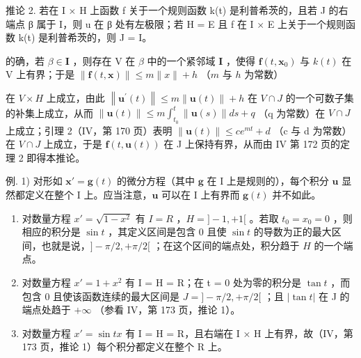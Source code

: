 推论 2. 若在 I × H 上函数 f 关于一个规则函数 k(t) 是利普希茨的，且若 J 的右端点 β 属于 I，则 u 在 β 处有左极限；若 H = E 且 f 在 I × E 上关于一个规则函数 k(t) 是利普希茨的，则 J = I。

的确，若 \(\beta \in \mathbf{I}\) ，则存在 \(\mathrm{V}\) 在 \(\beta\) 中的一个紧邻域 \(\mathbf{I}\) ，使得 \(\mathbf{f}(t, \mathbf{x}_0)\) 与 \(k(t)\) 在 \(\mathrm{V}\) 上有界；于是 \(\| \mathbf{f}(t, \mathbf{x}) \| \leqslant m \| x \| + h\) （\(m\) 与 \(h\) 为常数）

在 \(V \times H\) 上成立，由此 \(\left\|\mathbf{u}^{\prime}(t)\right\| \leqslant m \left\|\mathbf{u}(t)\right\| + h\) 在 \(V \cap J\) 的一个可数子集的补集上成立，从而 \(\left\|\mathbf{u}(t)\right\| \leqslant m \int_{t_{0}}^{t} \left\|\mathbf{u}(s)\right\| ds + q\) （q 为常数）在 \(V \cap J\) 上成立；引理 2（IV，第 170 页）表明 \(\left\|\mathbf{u}(t)\right\| \leqslant c e^{mt} + d\) （c 与 d 为常数）在 \(V \cap J\) 上成立，于是 \(\mathbf{f}(t, \mathbf{u}(t))\) 在 J 上保持有界，从而由 IV 第 172 页的定理 2 即得本推论。

例. 1) 对形如 \(\mathbf{x}' = \mathbf{g}(t)\) 的微分方程（其中 \(\mathbf{g}\) 在 I 上是规则的），每个积分 \(\mathbf{u}\) 显然都定义在整个 I 上。应当注意，\(\mathbf{u}\) 可以在 I 上有界而 \(\mathbf{g}(t)\) 并不如此。

\begin{enumerate}
\def\labelenumi{\arabic{enumi})}
\setcounter{enumi}{1}
\item
  对数量方程 \(x' = \sqrt{1 - x^2}\) 有 \(I = R\) ，\(H = ] - 1, +1[\) 。若取 \(t_0 = x_0 = 0\) ，则相应的积分是 \(\sin t\) ，其定义区间是包含 0 且使 \(\sin t\) 的导数为正的最大区间，也就是说，\(] - \pi / 2, +\pi / 2[\) ；在这个区间的端点处，积分趋于 \(H\) 的一个端点。
\item
  对数量方程 \(x' = 1 + x^{2}\) 有 I = H = R；在 t = 0 处为零的积分是 \(\tan t\) ，而包含 0 且使该函数连续的最大区间是 \(J = ] - \pi/2, +\pi/2[\) ；且 \(|\tan t|\) 在 J 的端点处趋于 \(+\infty\) （参看 IV，第 173 页，推论 1）。
\item
  对数量方程 \(x' = \sin tx\) 有 I = H = R，且右端在 I × H 上有界，故（IV，第 173 页，推论 1）每个积分都定义在整个 R 上。
\end{enumerate}

